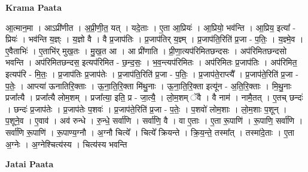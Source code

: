 \documentclass[17pt]{extarticle}
\begin{document}
\textbf{Krama Paata} \newline

आ॒त्मान॒मा । आऽप्री॑णीत । अ॒प्री॒णी॒त॒ यत् । यदे॒ताः । ए॒ता आ॒प्रियः॑ । आ॒प्रियो॒ भव॑न्ति । आ॒प्रिय॒ इत्या᳚ - प्रियः॑ । भव॑न्ति य॒ज्ञ्ः । य॒ज्ञो वै । वै प्र॒जाप॑तिः । प्र॒जाप॑तिर् य॒ज्ञ्म् । प्र॒जाप॑ति॒रिति॑ प्र॒जा - प॒तिः॒ । य॒ज्ञ्मे॒व । ए॒वैताभिः॑ । ए॒ताभि॑र् मुख॒तः । मु॒ख॒त आ । आ प्री॑णाति । प्री॒णा॒त्यप॑रिमितछन्दसः । अप॑रिमितछन्दसो भवन्ति । अप॑रिमितछन्दस॒ इत्यप॑रिमित - छ॒न्द॒सः॒ । भ॒व॒न्त्यप॑रिमितः । अप॑रिमितः प्र॒जाप॑तिः । अप॑रिमित॒ इत्यप॑रि - मि॒तः॒ । प्र॒जाप॑तिः प्र॒जाप॑तेः । प्र॒जाप॑ति॒रिति॑ प्र॒जा - प॒तिः॒ । प्र॒जाप॑ते॒राप्त्यै᳚ । प्र॒जाप॑ते॒रिति॑ प्र॒जा - प॒तेः॒ । आप्त्या॑ ऊनातिरि॒क्ताः । ऊ॒ना॒ति॒रि॒क्ता मि॑थु॒नाः । ऊ॒ना॒ति॒रि॒क्ता इत्यू॑न - अ॒ति॒रि॒क्ताः । मि॒थु॒नाः प्रजा᳚त्यै । प्रजा᳚त्यै लोम॒शम् । प्रजा᳚त्या॒ इति॒ प्र - जा॒त्यै॒ । लो॒म॒शम् ॅवै । वै नाम॑ । नामै॒तत् । ए॒तच् छन्दः॑ । छन्दः॑ प्र॒जाप॑तेः । प्र॒जाप॑तेः प॒शवः॑ । प्र॒जाप॑ते॒रिति॑ प्र॒जा - प॒तेः॒ । प॒शवो॑ लोम॒शाः । लो॒म॒शाः प॒शून् । प॒शूने॒व । ए॒वाव॑ । अव॑ रुन्धे । रु॒न्धे॒ सर्वा॑णि । सर्वा॑णि॒ वै । वा ए॒ताः । ए॒ता रू॒पाणि॑ । रू॒पाणि॒ सर्वा॑णि । सर्वा॑णि रू॒पाणि॑ । रू॒पाण्य॒ग्नौ । अ॒ग्नौ चित्ये᳚ । चित्ये᳚ क्रियन्ते । क्रि॒य॒न्ते॒ तस्मा᳚त् । तस्मा॑दे॒ताः । ए॒ता अ॒ग्नेः । अ॒ग्नेश्चित्य॑स्य । चित्य॑स्य भवन्ति \newline

\textbf{Jatai Paata} \newline
\end{document}
